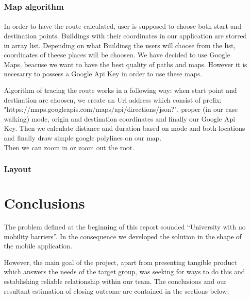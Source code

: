 \documentclass[12pt]{article}
\begin{document}
\subsubsection{Map algorithm}

\paragraph{}
In order to have the route calculated, user is supposed to choose both start and destination points. Buildings with their coordinates in our application are storred in array list. Depending on what Buildinsg the users will choose from the list, coordinates of theese places will be choosen. We have decided to use Google Maps, beacuse we want to have the best quality of paths and maps. However it is necesarry to possess a Google Api Key in order to use these maps.

Algorithm of tracing the route works in a following way: when start point and destination are choosen, we create an Url address which consist of prefix: "https://maps.googleapis.com/maps/api/directions/json?", proper (in our case walking) mode, origin and destination coordinates and finally our Google Api Key. Then we calculate distance and duration based on mode and both locations and finally draw simple google polylines on our map.\\
Then we can zoom in or zoom out the root.
\subsubsection{Layout}

\section{Conclusions}
\paragraph{}
The problem defined at the beginning of this report sounded ``University with no mobility barriers''.
In the consequence we developed the solution in the shape of the mobile application.

However, the main goal of the project, apart from presenting tangible product which answers the needs of the target group, was seeking for ways to do this and establishing reliable relationship within our team.
The conclusions and our resultant estimation of closing outcome are contained in the sections below.
\end{document}
